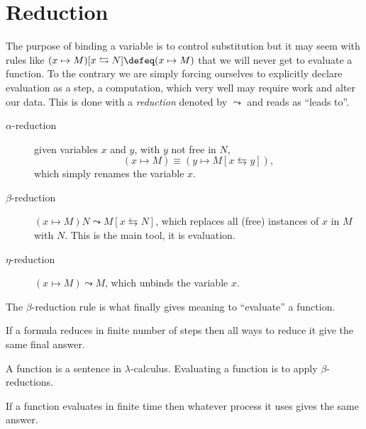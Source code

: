 \section{Reduction}
The purpose of binding a variable is to control substitution but it may seem 
with rules like $(x\mapsto M)[x\leftrightarrows N]\defeq (x\mapsto M)$ that 
we will never get to evaluate a function.  To the contrary we are simply forcing 
ourselves to explicitly declare evaluation as a step, a computation, which 
very well may require work and alter our data.  This is done with a \emph{reduction}
denoted by $\leadsto$ and reads as ``leads to''.\index{$\leadsto$}
\begin{description}
    \item[$\alpha$-reduction] given variables $x$ and $y$, with $y$ not free in $N$,
    \[(x\mapsto M)\equiv (y\mapsto M[x\leftrightarrows y]),\]
    which simply renames the variable $x$.

    \item[$\beta$-reduction]
    $(x\mapsto M)N\leadsto M[x\leftrightarrows N]$, which replaces all (free)
    instances of $x$ in $M$ with $N$.  This is the main tool, it is evaluation.
    
    \item[$\eta$-reduction]
    $(x\mapsto M)\leadsto M$, which unbinds the variable $x$.
\end{description}

The $\beta$-reduction rule is what finally gives meaning to ``evaluate'' a function.

\begin{theorem}
    If a formula reduces in finite number of steps then all ways to reduce it give the same 
    final answer.
\end{theorem}


\begin{definition}
    A function is a sentence in $\lambda$-calculus.
    Evaluating a function is to apply $\beta$-reductions.
\end{definition}

\begin{corollary}
    If a function evaluates in finite time then whatever process it uses 
    gives the same answer.
\end{corollary}

